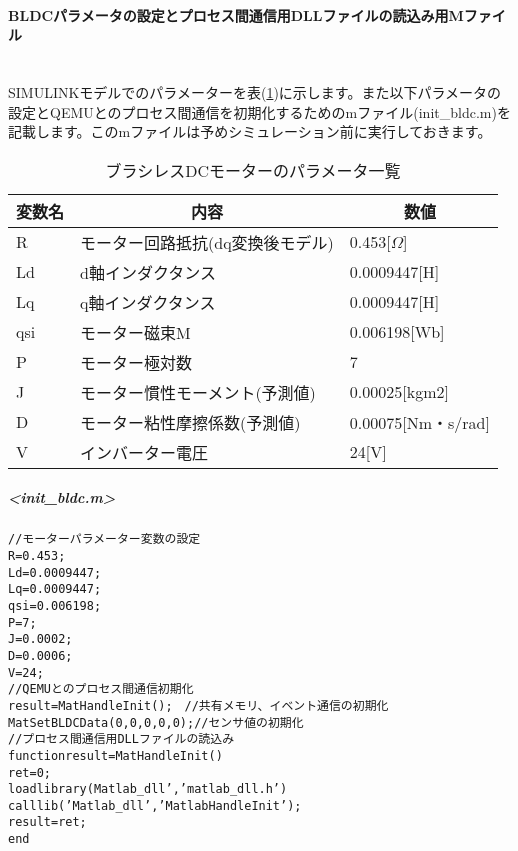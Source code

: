 \paragraph{BLDCパラメータの設定とプロセス間通信用DLLファイルの読込み用Mファイル}\mbox{}\\
SIMULINKモデルでのパラメーターを表(\ref{bldcprm})に示します。また以下パラメータの設定とQEMUとのプロセス間通信を初期化するためのmファイル(init\_bldc.m)を記載します。このmファイルは予めシミュレーション前に実行しておきます。
\begin{table}[htbp!]
\centering
\caption{ブラシレスDCモーターのパラメータ一覧}
\label{bldcprm}
\begin{tabular}{|l|l|l|}
\hline
\multicolumn{1}{|c|}{変数名} & \multicolumn{1}{c|}{内容} & \multicolumn{1}{c|}{数値} \\ \hline
R                         & モーター回路抵抗(dq変換後モデル)      & 0.453[$\Omega$]            \\ \hline
Ld                        & d軸インダクタンス               & 0.0009447{[}H{]}        \\ \hline
Lq                        & q軸インダクタンス               & 0.0009447{[}H{]}        \\ \hline
qsi                       & モーター磁束M                 & 0.006198{[}Wb{]}        \\ \hline
P                         & モーター極対数                 & 7                       \\ \hline
J                         & モーター慣性モーメント(予測値)        & 0.00025{[}kgm2{]}        \\ \hline
D                         & モーター粘性摩擦係数(予測値)         & 0.00075{[}Nm・s/rad{]}    \\ \hline
V                         & インバーター電圧                & 24{[}V{]}               \\ \hline
\end{tabular}
\end{table}
\newpage
\subparagraph{<init\_bldc.m>}
{\small
\begin{alltt}
//モーターパラメーター変数の設定
R = 0.453;
Ld = 0.0009447;
Lq = 0.0009447;
qsi = 0.006198;
P = 7;
J = 0.0002;
D = 0.0006;
V = 24;
//QEMUとのプロセス間通信初期化
result = MatHandleInit();　//共有メモリ、イベント通信の初期化
MatSetBLDCData(0,0,0,0,0); //センサ値の初期化
//プロセス間通信用DLLファイルの読込み
function  result = MatHandleInit()
    ret = 0;
    loadlibrary(Matlab_dll','matlab_dll.h')
    calllib('Matlab_dll','MatlabHandleInit');
    result = ret;
end
\end{alltt}
}
